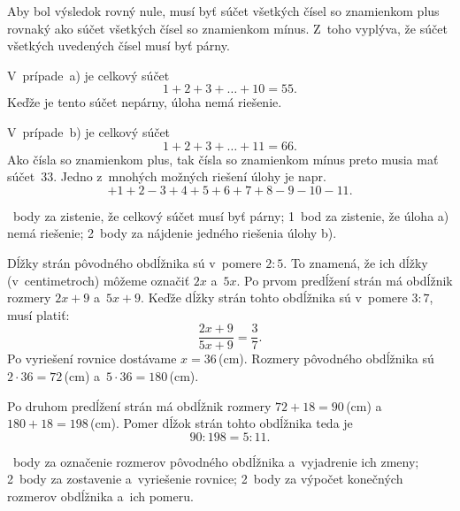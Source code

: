{%
Aby bol výsledok rovný nule, musí byť súčet všetkých čísel so znamienkom
plus rovnaký ako súčet všetkých čísel so znamienkom mínus. Z~toho
vyplýva, že súčet všetkých uvedených čísel musí byť párny.

V~prípade~a) je celkový súčet
$$
1+2+3+\dots+10 = 55.
$$
Keďže je tento súčet nepárny, úloha nemá riešenie.

V~prípade~b) je celkový súčet
$$
1+2+3+\dots+11 = 66.
$$
Ako čísla so znamienkom plus, tak čísla so znamienkom mínus preto musia mať
súčet~33.
Jedno z~mnohých možných riešení úlohy je napr.
$$
+1+2-3+4+5+6+7+8-9-10-11.
$$

~body za zistenie, že celkový súčet musí byť párny;
1~bod za zistenie, že úloha a) nemá riešenie;
2~body za nájdenie jedného riešenia úlohy b).
\endhodnotenie
}

{%
Dĺžky strán pôvodného obdĺžnika sú v~pomere $2:5$.
To znamená, že ich dĺžky (v~centimetroch) môžeme označiť $2x$ a~$5x$.
Po prvom predĺžení strán má obdĺžnik rozmery $2x+9$ a~$5x+9$.
Keďže dĺžky strán tohto obdĺžnika sú v~pomere $3:7$, musí platiť:
$$
\frac{2x+9}{5x+9}=\frac37.
$$
Po vyriešení rovnice dostávame $x=36$\,(cm).
Rozmery pôvodného obdĺžnika sú $2\cdot 36=72$\,(cm) a~$5\cdot 36=180$\,(cm).

Po druhom predĺžení strán má obdĺžnik rozmery $72+18=90$\,(cm) a~$180+18=198$\,(cm).
Pomer dĺžok strán tohto obdĺžnika teda je
$$
90:198=5:11.
$$

~body za označenie rozmerov pôvodného obdĺžnika a~vyjadrenie ich zmeny;
2~body za zostavenie a~vyriešenie rovnice;
2~body za výpočet konečných rozmerov obdĺžnika a~ich pomeru.
\endhodnotenie}

